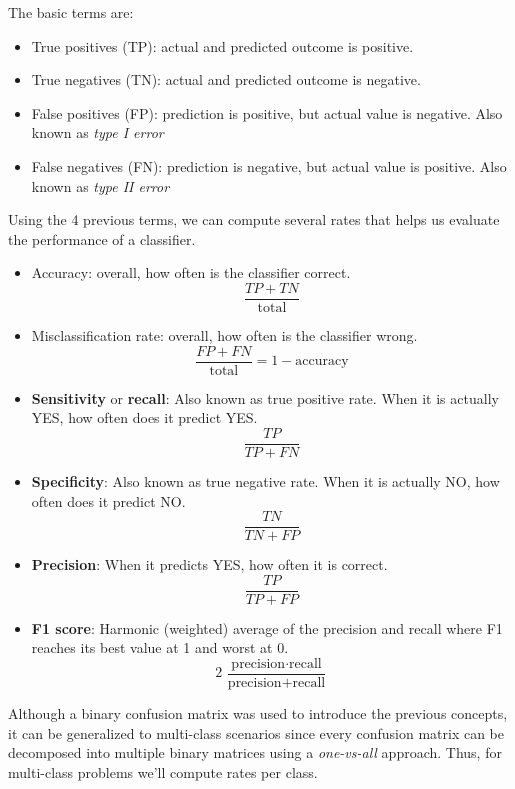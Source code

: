 The basic terms are:
\begin{itemize}
	\item True positives (TP): actual and predicted outcome is positive.
	\item True negatives (TN): actual and predicted outcome is negative.
	\item False positives (FP): prediction is positive, but actual value is negative. Also known as \textit{type I error}
	\item False negatives (FN): prediction is negative, but actual value is positive. Also known as \textit{type II error}
\end{itemize}

Using the 4 previous terms, we can compute several rates that helps us evaluate the performance of a classifier.
\begin{itemize}
	\item Accuracy: overall, how often is the classifier correct.
	$$ \frac{TP + TN}{\text{total}} $$
	\item Misclassification rate: overall, how often is the classifier wrong.
	$$ \frac{FP + FN}{\text{total}} = 1 - \text{accuracy} $$
	\item \textbf{Sensitivity} or \textbf{recall}: Also known as true positive rate. When it is actually YES, how often does it predict YES.
	$$ \frac{TP}{TP + FN} $$
	\item \textbf{Specificity}: Also known as true negative rate. When it is actually NO, how often does it predict NO.
	$$ \frac{TN}{TN + FP} $$
	\item \textbf{Precision}: When it predicts YES, how often it is correct.
	$$ \frac{TP}{TP + FP} $$
	\item \textbf{F1 score}: Harmonic (weighted) average of the precision and recall where F1 reaches its best value at 1 and worst at 0. 
	$$ 2 \, \frac{\text{precision} \cdot \text{recall}}{\text{precision} + \text{recall}} $$
\end{itemize}

Although a binary confusion matrix was used to introduce the previous concepts, it can be generalized to multi-class scenarios since every confusion matrix can be decomposed into multiple binary matrices using a \textit{one-vs-all} approach. Thus, for multi-class problems we'll compute rates per class.
